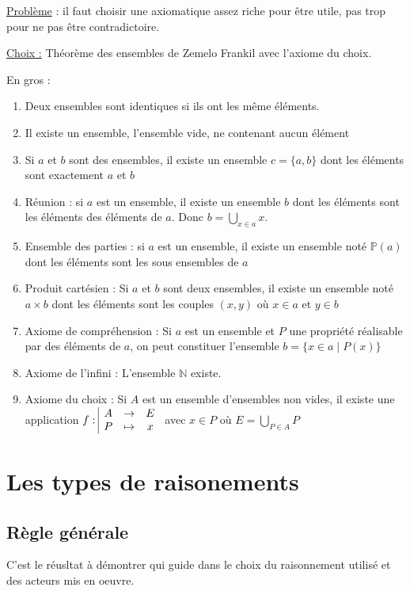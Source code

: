 \underline{Problème} : il faut choisir une axiomatique assez riche pour être utile, 
pas trop pour ne pas être contradictoire. 

\underline{Choix :} Théorème des ensembles de Zemelo Frankil avec l'axiome du choix.

En gros : 

\begin{enumerate}
    \item Deux ensembles sont identiques si ils ont les même éléments. 
    \item Il existe un ensemble, l'ensemble vide, ne contenant aucun élément
    \item Si $a$ et $b$ sont des ensembles, il existe un ensemble $c = \{a, b\}$
            dont les éléments sont exactement $a$ et $b$
    \item Réunion : si $a$ est un ensemble, il existe un ensemble $b$ dont les éléments
        sont les éléments des éléments de $a$. Donc $b = \bigcup_{x \in a} x$.
    \item Ensemble des parties : si $a$ est un ensemble, il existe un ensemble noté
        $\mathbb P(a)$ dont les éléments sont les sous ensembles de $a$
    \item Produit cartésien : Si $a$ et $b$ sont deux ensembles, il existe un ensemble
        noté $a \times b$ dont les éléments sont les couples $(x, y)$ où $x \in a$ 
        et $y \in b$
    \item Axiome de compréhension : Si $a$ est un ensemble et $P$ une propriété réalisable
        par des éléments de $a$, on peut constituer l'ensemble $b = \{x \in a \mid P(x)\}$
    \item Axiome de l'infini : L'ensemble $\mathbb N$ existe.
    \item Axiome du choix : Si $A$ est un ensemble d'ensembles non vides, il existe une 
        application $f: \space \begin{array}{|ccc} \displaystyle A & \to & \displaystyle E \\ \displaystyle P & \mapsto & \displaystyle x \end{array}$ avec $x \in P$ où $E = \bigcup_{P \in A} P$
\end{enumerate}

\section{Les types de raisonements}

\subsection{Règle générale}

C'est le réusltat à démontrer qui guide dans le choix du raisonnement utilisé et des
acteurs mis en oeuvre. 

